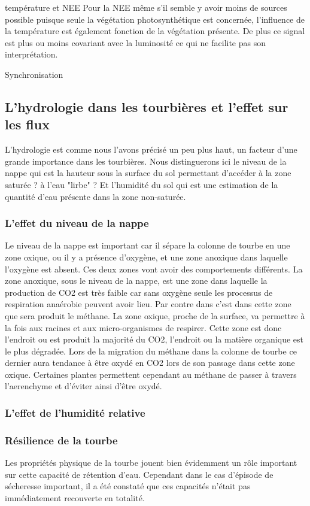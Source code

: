 température et NEE
Pour la NEE même s'il semble y avoir moins de sources possible puisque seule la végétation photosynthétique est concernée, l'influence de la température est également fonction de la végétation présente.
De plus ce signal est plus ou moins covariant avec la luminosité ce qui ne facilite pas son interprétation.

Synchronisation


\subsection{L'hydrologie dans les tourbières et l'effet sur les flux}
L'hydrologie est comme nous l'avons précisé un peu plus haut, un facteur d'une grande importance dans les tourbières.
Nous distinguerons ici le niveau de la nappe qui est la hauteur sous la surface du sol permettant d'accéder à la zone saturée ? à l'eau "lirbe" ?
Et l'humidité du sol qui est une estimation de la quantité d'eau présente dans la zone non-saturée.

\subsubsection{L'effet du niveau de la nappe}
Le niveau de la nappe est important car il sépare la colonne de tourbe en une zone oxique, ou il y a présence d'oxygène, et une zone anoxique dans laquelle l'oxygène est absent.
Ces deux zones vont avoir des comportements différents.
La zone anoxique, sous le niveau de la nappe, est une zone dans laquelle la production de CO2 est très faible car sans oxygène seule les processus de respiration anaérobie peuvent avoir lieu.
Par contre dans c'est dans cette zone que sera produit le méthane.
La zone oxique, proche de la surface, va permettre à la fois aux racines et aux micro-organismes de respirer.
Cette zone est donc l'endroit ou est produit la majorité du CO2, l'endroit ou la matière organique est le plus dégradée.
Lors de la migration du méthane dans la colonne de tourbe ce dernier aura tendance à être oxydé en CO2 lors de son passage dans cette zone oxique.
Certaines plantes permettent cependant au méthane de passer à travers l'aerenchyme et d'éviter ainsi d'être oxydé.

\subsubsection{L'effet de l'humidité relative}

\subsubsection{Résilience de la tourbe}
Les propriétés physique de la tourbe jouent bien évidemment un rôle important sur cette capacité de rétention d'eau.
Cependant dans le cas d'épisode de sécheresse important, il a été constaté que ces capacités n'était pas immédiatement recouverte en totalité.


